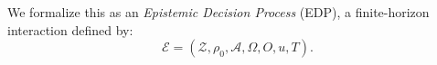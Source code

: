 \documentclass[11pt]{article}
\theoremstyle{plain}
\theoremstyle{definition}
\theoremstyle{remark}
\begin{document}


We formalize this as an \emph{Epistemic Decision Process} (EDP), a finite-horizon interaction defined by:
\[
    \mathcal{E}=\left(\mathcal{Z},\rho_0,\mathcal{A},\Omega,O,u,T\right).
\]
\end{document}
